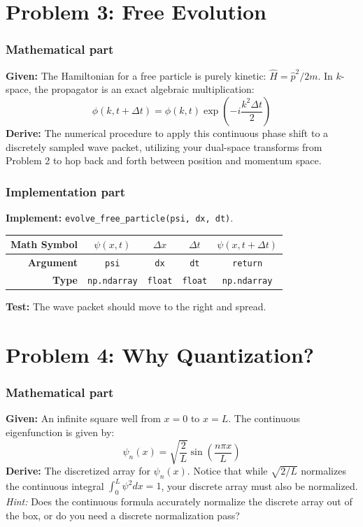 \documentclass[11pt]{article}
\begin{document}
\section*{Problem 3: Free Evolution}

\subsubsection*{Mathematical part}
\textbf{Given:} The Hamiltonian for a free particle is purely kinetic: $\hat{H} = \hat{p}^2 / 2m$. In $k$-space, the propagator is an exact algebraic multiplication:
$$ \phi(k, t+\Delta t) = \phi(k, t) \exp\left(-i \frac{k^2 \Delta t}{2}\right) $$
\textbf{Derive:} The numerical procedure to apply this continuous phase shift to a discretely sampled wave packet, utilizing your dual-space transforms from Problem 2 to hop back and forth between position and momentum space.

\subsubsection*{Implementation part}
\textbf{Implement:} \lstinline|evolve_free_particle(psi, dx, dt)|.
\begin{center}
\renewcommand{\arraystretch}{2.0}
\begin{tabular}{r | c | c | c | c}
\toprule
\textbf{Math Symbol} & $\psi(x, t)$ & $\Delta x$ & $\Delta t$ & $\psi(x, t+\Delta t)$ \\
\midrule
\textbf{Argument} & \lstinline|psi| & \lstinline|dx| & \lstinline|dt| & \lstinline|return| \\
\midrule
\textbf{Type} & \lstinline|np.ndarray| & \lstinline|float| & \lstinline|float| & \lstinline|np.ndarray| \\
\bottomrule
\end{tabular}
\end{center}
\textbf{Test:} The wave packet should move to the right and spread.


\section*{Problem 4: Why Quantization?}

\subsubsection*{Mathematical part}
\textbf{Given:} An infinite square well from $x=0$ to $x=L$. The continuous eigenfunction is given by:
$$ \psi_n(x) = \sqrt{\frac{2}{L}}\sin\left(\frac{n\pi x}{L}\right) $$
\textbf{Derive:} The discretized array for $\psi_n(x)$. Notice that while $\sqrt{2/L}$ normalizes the continuous integral $\int_0^L \psi^2 dx = 1$, your discrete array must also be normalized. \textit{Hint:} Does the continuous formula accurately normalize the discrete array out of the box, or do you need a discrete normalization pass?
\end{document}
